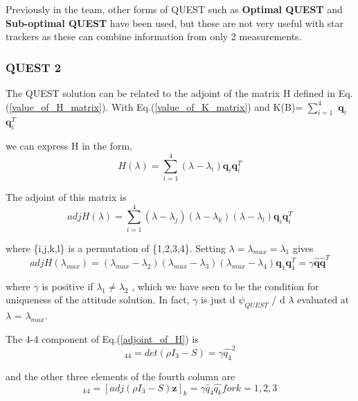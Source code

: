 \documentclass[../../main.tex]{subfiles}
\begin{document}
{{{Previously in the team, other forms of QUEST such as \textbf{Optimal QUEST} and \textbf{Sub-optimal QUEST } have been used, but these are not very useful with star trackers as these can combine information from only 2 measurements.

}



\subsubsection{QUEST 2} 
{
The QUEST solution can be related to the adjoint of the matrix H defined in Eq.(\ref{value_of_H_matrix}). With Eq.(\ref{value_of_K_matrix}) and K(B)= $\sum_{i=1}^{4}$ $\mathbf{q}_{i}$ $\mathbf{q}_{i}^{T}$

we can express H in the form,
\begin{equation}
    H(\lambda) = \sum_{i=1}^{4} (\lambda - \lambda_{i}) \textbf{q}_{i} \textbf{q}_{i}^{T}
\end{equation}

The adjoint of this matrix is 
\begin{equation}
\label{adjoint_of_H}
   adj H(\lambda)= \sum_{i=1}^{4} (\lambda - \lambda_{j}) (\lambda - \lambda_{k}) (\lambda - \lambda_{l}) \textbf{q}_{i} \textbf{q}_{i}^{T}
\end{equation}

where \{i,j,k,l\} is a permutation of \{1,2,3,4\}. Setting $\lambda = \lambda_{max} = \lambda_{1}$ gives
\begin{equation}
   adj H(\lambda_{max}) = (\lambda_{max} - \lambda_{2}) (\lambda_{max} - \lambda_{3}) (\lambda_{max} - \lambda_{4}) \textbf{q}_{1} \textbf{q}_{1}^{T} = \gamma \hat{\textbf{q}} \hat{\textbf{q}}^{T}
\end{equation}

where $\gamma$ is positive if $\lambda_{1} \ne \lambda_{2}$ , which we have seen to be the condition for uniqueness of the attitude solution. In fact, $\gamma$ is just d $\psi_{QUEST}$ / d $\lambda$ evaluated at $\lambda$ = $\lambda_{max}$.

The 4-4 component of Eq.(\ref{adjoint_of_H}) is
\begin{equation}
   [adj H(\lambda_{max})]_{44} = det(\rho I_{3} - S) = \gamma \hat{q_{4}}^{2}
\end{equation}

and the other three elements of the fourth column are 
\begin{equation}
   [adj H(\lambda_{max})]_{k4} = [adj(\rho I_{3} - S) \textbf{z}]_{k} = \gamma \hat{q}_{4} \hat{q_{k}}  for  k = 1,2,3
\end{equation}

}}}
\end{document}
